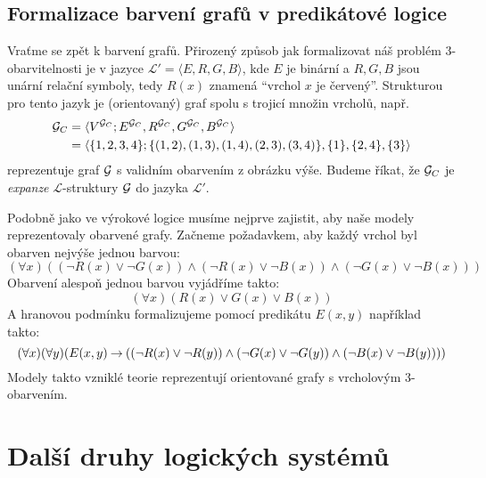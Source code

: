 \subsection{Formalizace barvení grafů v predikátové logice}


Vraťme se zpět k barvení grafů. Přirozený způsob jak formalizovat náš problém 3-obarvitelnosti je v jazyce \( \mathcal L' =\langle E, R, G, B \rangle \), kde \(E\) je binární a \(R,G,B\) jsou unární relační symboly, tedy \(R(x)\) znamená ``vrchol \(x\) je červený''. Strukturou pro tento jazyk je (orientovaný) graf spolu s trojicí množin vrcholů, např.
\begin{align*}
\mathcal{G}_C &= \langle V^{\mathcal{G}_C}; E^{\mathcal{G}_C}, R^{\mathcal{G}_C}, G^{\mathcal{G}_C}, B^{\mathcal{G}_C} \rangle \\
&= \langle \{1,2,3,4\}; \{(1,2),(1,3),(1,4),(2,3),(3,4)\}, \{1\}, \{2,4\}, \{3\} \rangle    
\end{align*}
reprezentuje graf \( \mathcal{G} \) s validním obarvením z obrázku výše. Budeme říkat, že \( \mathcal{G}_C \) je \emph{expanze} \(\mathcal L\)-struktury \( \mathcal{G} \) do jazyka \( \mathcal L' \).

Podobně jako ve výrokové logice musíme nejprve zajistit, aby naše modely reprezentovaly obarvené grafy. Začneme požadavkem, aby každý vrchol byl obarven nejvýše jednou barvou:
\[
(\forall x)((\neg R(x) \lor \neg G(x)) \land (\neg R(x) \lor \neg B(x)) \land (\neg G(x) \lor \neg B(x)))
\]
Obarvení alespoň jednou barvou vyjádříme takto:
\[
(\forall x)(R(x) \lor G(x) \lor B(x))
\]
A hranovou podmínku formalizujeme pomocí predikátu \( E(x,y) \) například takto:
\[	
(\forall x)(\forall y)(E(x,y) \mathbin{\rightarrow} ((\neg R(x) \lor \neg R(y)) \land (\neg G(x) \lor \neg G(y)) \land (\neg B(x) \lor \neg B(y))))
\]
Modely takto vzniklé teorie reprezentují orientované grafy s vrcholovým 3-obarvením. 


\section{Další druhy logických systémů}

